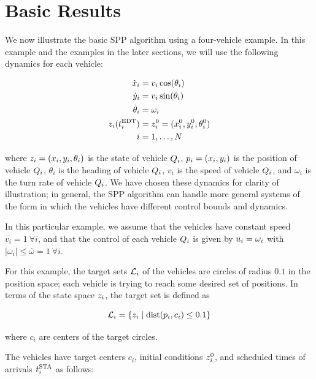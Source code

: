\section{Basic Results \label{sec:basic_results}}
We now illustrate the basic SPP algorithm using a four-vehicle example. In this example and the examples in the later sections, we will use the following dynamics for each vehicle:

\begin{equation}
\begin{aligned}
\dot x_i &= v_i \cos(\theta_i) \\
\dot y_i &= v_i \sin(\theta_i) \\
\dot \theta_i &= \omega_i \\
z_i(t^\text{EDT}_i) &= z_i^0 = (x_i^0, y_i^0, \theta_i^0) \\
i &= 1, \ldots, N
\end{aligned}
\end{equation}

\noindent where $z_i = (x_i, y_i, \theta_i)$ is the state of vehicle $Q_{i}$, $p_i = (x_i, y_i)$ is the position of vehicle $Q_{i}$, $\theta_i$ is the heading of vehicle $Q_{i}$, $v_i$ is the speed of vehicle $Q_{i}$, and $\omega_i$ is the turn rate of vehicle $Q_{i}$. We have chosen these dynamics for clarity of illustration; in general, the SPP algorithm can handle more general systems of the form in which the vehicles have different control bounds and dynamics. 

In this particular example, we assume that the vehicles have constant speed $v_i = 1 ~ \forall i$, and that the control of each vehicle $Q_{i}$ is given by $u_i = \omega_i$ with $|\omega_i| \le \bar\omega = 1 ~ \forall i$. 

For this example, the target sets $\mathcal{L}_i$ of the vehicles are circles of radius $0.1$ in the position space; each vehicle is trying to reach some desired set of positions. In terms of the state space $z_i$, the target set is defined as

\begin{equation}
\mathcal{L}_i = \{z_i \mid \text{dist}(p_i, c_i) \le 0.1\}
\end{equation}

\noindent where $c_i$ are centers of the target circles.

The vehicles have target centers $c_i$, initial conditions $z_i^0$, and scheduled times of arrivals $t^\text{STA}_i$ as follows:


